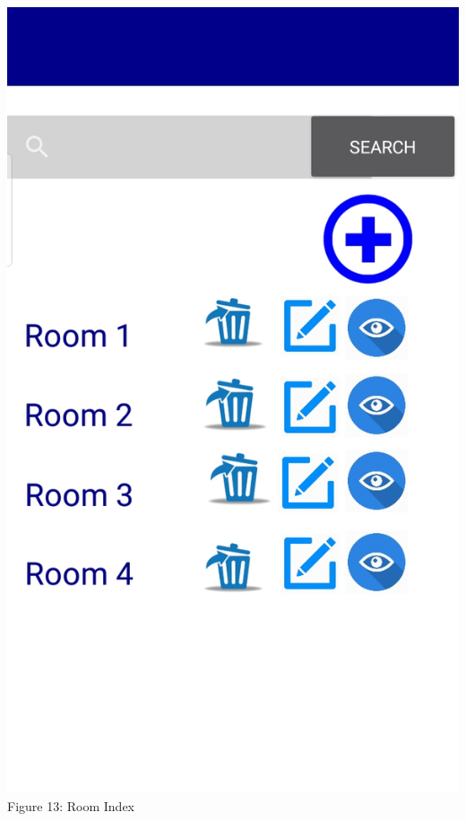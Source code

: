 \documentclass{article}
\begin{document}
\begin{center}
\includegraphics[scale=0.20]{f8}
\\Figure 13: Room Index
\end{center}
\end{document}

